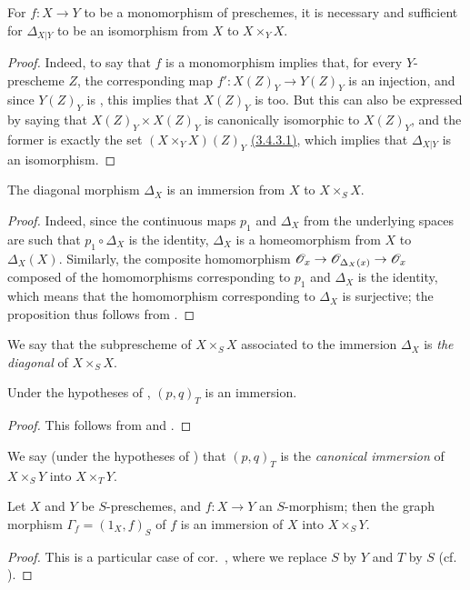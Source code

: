 \begin{prop}[5.3.8]
\label{1.5.3.8}
For $f:X\to Y$ to be a monomorphism of preschemes, it is necessary and sufficient for $\Delta_{X|Y}$ to be an isomorphism from $X$ to $X\times_Y X$.
\end{prop}

\begin{proof}
\label{1.5.3.8}
Indeed, to say that $f$ is a monomorphism implies that, for every $Y$-prescheme $Z$, the corresponding map $f':X(Z)_Y\to Y(Z)_Y$ is an injection, and since $Y(Z)_Y$ is , this implies that $X(Z)_Y$ is too.
But this can also be expressed by saying that $X(Z)_Y\times X(Z)_Y$ is canonically isomorphic to $X(Z)_Y$, and the former is exactly the set $(X\times_Y X)(Z)_Y$ \hyperref[1.3.4.3]{(3.4.3.1)}, which implies that $\Delta_{X|Y}$ is an isomorphism.
\end{proof}

\begin{prop}[5.3.9]
\label{1.5.3.9}
The diagonal morphism $\Delta_X$ is an immersion from $X$ to $X\times_S X$.
\end{prop}

\begin{proof}
\label{proof-1.5.3.9}
Indeed, since the continuous maps $p_1$ and $\Delta_X$ from the underlying spaces are such that $p_1\circ\Delta_X$ is the identity, $\Delta_X$ is a homeomorphism from $X$ to $\Delta_X(X)$.
Similarly, the composite homomorphism $\OO_x\to\OO_{\Delta_X(x)}\to\OO_x$ composed of the homomorphisms corresponding to $p_1$ and $\Delta_X$ is the identity, which means that the homomorphism corresponding to $\Delta_X$ is surjective;
the proposition thus follows from .
\end{proof}

We say that the subprescheme of $X\times_S X$ associated to the immersion $\Delta_X$  is \emph{the diagonal} of $X\times_S X$.

\begin{cor}[5.3.10]
\label{1.5.3.10}
Under the hypotheses of , $(p,q)_T$ is an immersion.
\end{cor}

\begin{proof}
\label{proof-1.5.3.10}
This follows from  and .
\end{proof}

We say (under the hypotheses of ) that $(p,q)_T$ is the \emph{canonical immersion} of $X\times_S Y$ into $X\times_T Y$.

\begin{cor}[5.3.11]
\label{1.5.3.11}
Let $X$ and $Y$ be $S$-preschemes, and $f:X\to Y$ an $S$-morphism;
then the graph morphism $\Gamma_f=(1_X,f)_S$ of $f$  is an immersion of $X$ into $X\times_S Y$.
\end{cor}

\begin{proof}
\label{proof-1.5.3.11}
This is a particular case of cor.~, where we replace $S$ by $Y$ and $T$ by $S$ (cf. ).
\end{proof}

